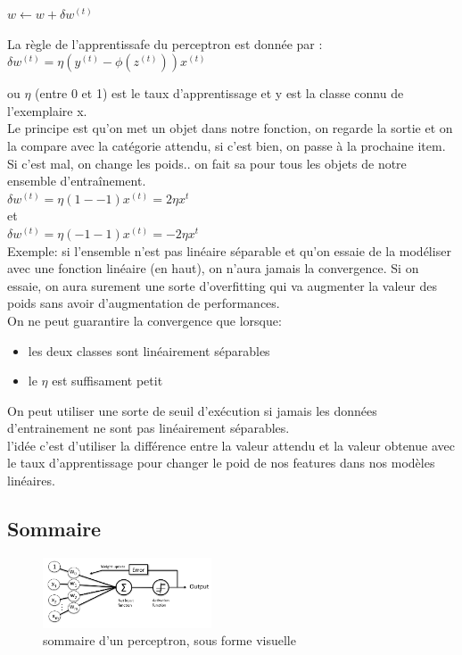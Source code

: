 \documentclass[oneside]{book}
\begin{document}
$w \leftarrow w + \delta w^{(t)}$

La règle de l'apprentissafe du perceptron est donnée par :\\

\centering
$\delta w^{(t)} = \eta (y^{(t)} - \phi (z^{(t)})) x^{(t)}$
\justify

ou $\eta$ (entre 0 et 1) est le taux d'apprentissage et y est la classe connu de l'exemplaire x.\\

Le principe est qu'on met un objet dans notre fonction, on regarde la sortie et on la compare avec la catégorie attendu, si c'est bien, on passe à la prochaine item. Si c'est mal, on change les poids.. on fait sa pour tous les objets de notre ensemble d'entraînement.\\

\centering
$\delta w^{(t)} = \eta (1 -- 1) x^{(t)} = 2 \eta x^t$\\
et\\
$\delta w^{(t)} = \eta (-1 -1) x^{(t)} = -2 \eta x^t$\\
\justify
Exemple: si l'ensemble n'est pas linéaire séparable et qu'on essaie de la modéliser avec une fonction linéaire (en haut), on n'aura jamais la convergence. Si on essaie, on aura surement une sorte d'overfitting qui va augmenter la valeur des poids sans avoir d'augmentation de performances. \\

On ne peut guarantire la convergence que lorsque:\\
\begin{itemize}
\item les deux classes sont linéairement séparables
\item le $\eta$ est suffisament petit
\end{itemize}
On peut utiliser une sorte de seuil d'exécution si jamais les données d'entrainement ne sont pas linéairement séparables.\\

l'idée c'est d'utiliser la différence entre la valeur attendu et la valeur obtenue avec le taux d'apprentissage pour changer le poid de nos features dans nos modèles linéaires.

\subsection{Sommaire}
\begin{figure}[!ht]
\centering
\includegraphics[width = 5cm]{sommaire.png}
\caption{sommaire d'un perceptron, sous forme visuelle}
\label{fig:sommaire_ML}
\end{figure}
\end{document}
